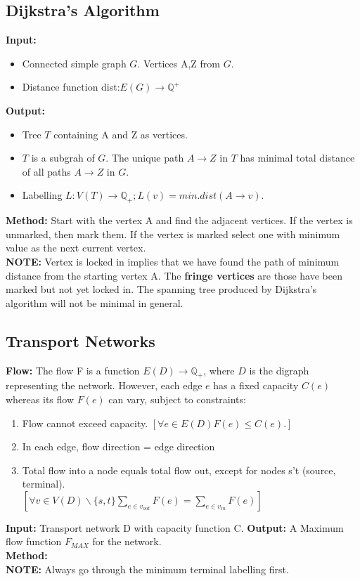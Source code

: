 \documentclass{article}
\begin{document}
\begin{spacing}{1.5}
\subsection{Dijkstra's Algorithm}
\textbf{Input:} 
\begin{itemize}
    \item Connected simple graph $G$. Vertices A,Z from $G$. 
    \item Distance function dist:$E(G) \rightarrow \mathbb{Q}^+$
\end{itemize}
\textbf{Output:}
\begin{itemize}
    \item Tree $T$ containing A and Z as vertices.
    \item $T$ is a subgrah of $G$. The unique path $A \rightarrow Z$ in $T$ has minimal total distance of all paths $A \rightarrow Z$ in $G$.
    \item Labelling $L:V(T) \rightarrow \mathbb{Q}_+; L(v)=min.dist(A \rightarrow v)$. 
\end{itemize}
\textbf{Method:} Start with the vertex A and find the adjacent vertices. If the vertex is unmarked, then mark them. If the vertex is marked select one with minimum value as the next current vertex.\\
\textbf{NOTE:} Vertex is locked in implies that we have found the path of minimum distance from the starting vertex A. The \textbf{fringe vertices} are those have been marked but not yet locked in. The spanning tree produced by Dijkstra's algorithm will not be minimal in general.

\subsection{Transport Networks}
\textbf{Flow:} The flow F is a function $E(D) \rightarrow \mathbb{Q}_+$, where $D$ is the digraph representing the network. However, each edge $e$ has a fixed capacity $C(e)$ whereas its flow $F(e)$ can vary, subject to constraints:
\begin{enumerate}
    \item Flow cannot exceed capacity. $[\forall e \in E(D) F(e) \le C(e).]$
    \item In each edge, flow direction = edge direction 
    \item Total flow into a node equals total flow out, except for nodes s’t (source, terminal).\\ 
    $[\forall v \in V(D) \backslash \{s,t\} \sum_{e\in v_{out}}F(e)=\sum_{e\in v_{in}}F(e)]$
\end{enumerate} 
\textbf{Input:} Transport network D with capacity function C.
\textbf{Output:} A Maximum flow function $F_{MAX}$ for the network.\\  
\textbf{Method:} \\
\textbf{NOTE:} Always go through the minimum terminal labelling first. 

\end{spacing}
\end{document}
